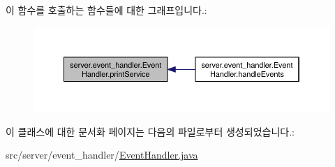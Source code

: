 이 함수를 호출하는 함수들에 대한 그래프입니다.\-:
\nopagebreak
\begin{figure}[H]
\begin{center}
\leavevmode
\includegraphics[width=350pt]{classserver_1_1event__handler_1_1_event_handler_afc87125b5bd2e5d255a4fd0af12bebcb_icgraph}
\end{center}
\end{figure}




이 클래스에 대한 문서화 페이지는 다음의 파일로부터 생성되었습니다.\-:\begin{DoxyCompactItemize}
\item 
src/server/event\-\_\-handler/\hyperlink{_event_handler_8java}{Event\-Handler.\-java}\end{DoxyCompactItemize}
